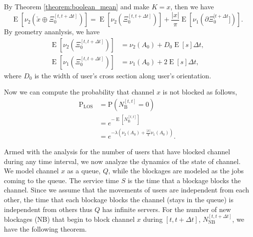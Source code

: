\documentclass[10pt, conference, letterpaper]{IEEEtran}
\DeclareMathOperator*{\E}{\mathrm{E}}
\begin{document}
By Theorem \ref{theorem:boolean_mean} and make $K = x$, then we have
\begin{equation*}\label{eq:boolean_mean}
\E[\nu_2(\check{x}\oplus\Xi_0^{[t, t+\Delta t]})] = \E[\nu_2(\Xi_0^{[t, t+\Delta t]})] + \frac{|x|}{\pi}\E[\nu_1(\partial \Xi_0^{[t + \Delta t}])].
\end{equation*}
By geometry ananlysis, we have
\begin{equation*}
\begin{split}
\E[\nu_2(\Xi_0^{[t, t+\Delta t]})] & = \nu_2(A_0) + D_0\E[s]\Delta t,\\
\E[\nu_1(\Xi_0^{[t, t+\Delta t]})] & = \nu_1(A_0) + 2\E[s]\Delta t,
\end{split}
\end{equation*}
where $D_0$ is the width of user's cross section along user's orientation.

Now we can compute the probability that channel $x$ is not blocked as follows, 
\begin{equation}\label{eq:P_LOS}
\begin{aligned}
\mathrm{P}_{\mathrm{LOS}} & = \mathrm{P}(N_{\mathrm{B}}^{[t, t]}=0)  \\
& = e^{-\E[N_\mathrm{B}^{[t,t]}]} \\
& = e^{-\lambda(\nu_2(A_0) + \frac{|x|}{\pi}\nu_1(A_0))}. 
\end{aligned}
\end{equation}

Armed with the analysis for the number of users that have blocked channel during any time interval, we now analyze the dynamics of the state of channel. We model channel $x$ as a queue, $Q$, while the blockages are modeled as the jobs coming to the queue. 
The service time $S$ is the time that a blockage blocks the channel. Since we assume that the movements of users are independent from each other, the time that each blockage blocks the channel (stays in the queue) is independent from others thus $Q$ has infinite servers. For the number of new blockages (NB) that begin to block channel $x$ during $[t, t+\Delta t]$, $N_{\mathrm{NB}}^{[t, t+\Delta t]}$, we have the following theorem.
\end{document}
